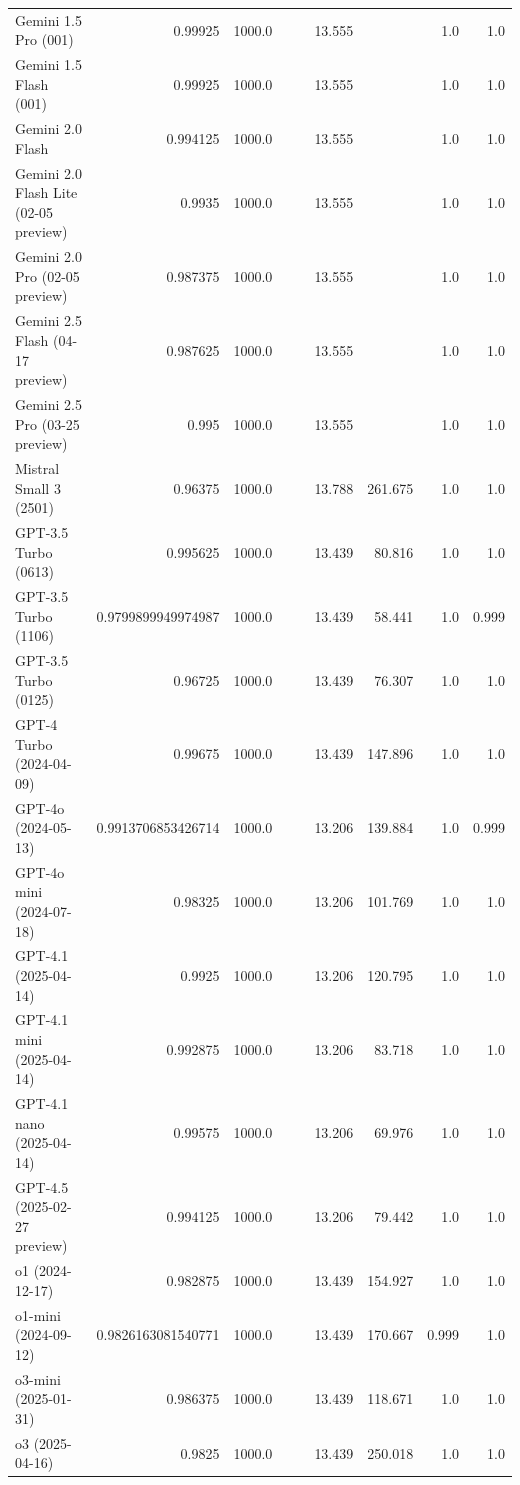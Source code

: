 \begin{table}[htp]
{\begin{tabular}{lrrrrrrrr}
Gemini 1.5 Pro (001) & 0.99925 & 1000.0 &  &  & 13.555 &  & 1.0 & 1.0 \\
Gemini 1.5 Flash (001) & 0.99925 & 1000.0 &  &  & 13.555 &  & 1.0 & 1.0 \\
Gemini 2.0 Flash & 0.994125 & 1000.0 &  &  & 13.555 &  & 1.0 & 1.0 \\
Gemini 2.0 Flash Lite (02-05 preview) & 0.9935 & 1000.0 &  &  & 13.555 &  & 1.0 & 1.0 \\
Gemini 2.0 Pro (02-05 preview) & 0.987375 & 1000.0 &  &  & 13.555 &  & 1.0 & 1.0 \\
Gemini 2.5 Flash (04-17 preview) & 0.987625 & 1000.0 &  &  & 13.555 &  & 1.0 & 1.0 \\
Gemini 2.5 Pro (03-25 preview) & 0.995 & 1000.0 &  &  & 13.555 &  & 1.0 & 1.0 \\
Mistral Small 3 (2501) & 0.96375 & 1000.0 &  &  & 13.788 & 261.675 & 1.0 & 1.0 \\
GPT-3.5 Turbo (0613) & 0.995625 & 1000.0 &  &  & 13.439 & 80.816 & 1.0 & 1.0 \\
GPT-3.5 Turbo (1106) & 0.9799899949974987 & 1000.0 &  &  & 13.439 & 58.441 & 1.0 & 0.999 \\
GPT-3.5 Turbo (0125) & 0.96725 & 1000.0 &  &  & 13.439 & 76.307 & 1.0 & 1.0 \\
GPT-4 Turbo (2024-04-09) & 0.99675 & 1000.0 &  &  & 13.439 & 147.896 & 1.0 & 1.0 \\
GPT-4o (2024-05-13) & 0.9913706853426714 & 1000.0 &  &  & 13.206 & 139.884 & 1.0 & 0.999 \\
GPT-4o mini (2024-07-18) & 0.98325 & 1000.0 &  &  & 13.206 & 101.769 & 1.0 & 1.0 \\
GPT-4.1 (2025-04-14) & 0.9925 & 1000.0 &  &  & 13.206 & 120.795 & 1.0 & 1.0 \\
GPT-4.1 mini (2025-04-14) & 0.992875 & 1000.0 &  &  & 13.206 & 83.718 & 1.0 & 1.0 \\
GPT-4.1 nano (2025-04-14) & 0.99575 & 1000.0 &  &  & 13.206 & 69.976 & 1.0 & 1.0 \\
GPT-4.5 (2025-02-27 preview) & 0.994125 & 1000.0 &  &  & 13.206 & 79.442 & 1.0 & 1.0 \\
o1 (2024-12-17) & 0.982875 & 1000.0 &  &  & 13.439 & 154.927 & 1.0 & 1.0 \\
o1-mini (2024-09-12) & 0.9826163081540771 & 1000.0 &  &  & 13.439 & 170.667 & 0.999 & 1.0 \\
o3-mini (2025-01-31) & 0.986375 & 1000.0 &  &  & 13.439 & 118.671 & 1.0 & 1.0 \\
o3 (2025-04-16) & 0.9825 & 1000.0 &  &  & 13.439 & 250.018 & 1.0 & 1.0 \\

\end{tabular}}
\end{table}
